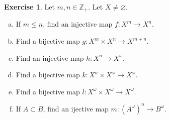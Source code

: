 \documentclass[11pt,a4paper,twoside]{article}
\theoremstyle{definition}
\newcounter{excounter}
\newtheorem{exercise}[excounter]{Exercise}
\begin{document}
\begin{exercise}

  Let $m, n \in \mathbb{Z}_+$. Let $X \neq \varnothing$.
  \begin{enumerate}[(a)]
  \item If $m \leq n$, find an injective map $f : X^m \to X^n$.
  \item Find a bijective map $g : X^m \times X^n \to X^{m + n}$.
  \item Find an injective map $h : X^n \to X^\omega$.
  \item Find a bijective map $k : X^n \times X^\omega \to X^\omega$.
  \item Find a bijective map $l : X^\omega \times X^\omega \to X^\omega$.
  \item If $A \subset B$, find an ijective map $m : (A^\omega)^n \to B^\omega$.
  \end{enumerate}

\end{exercise}
\end{document}
